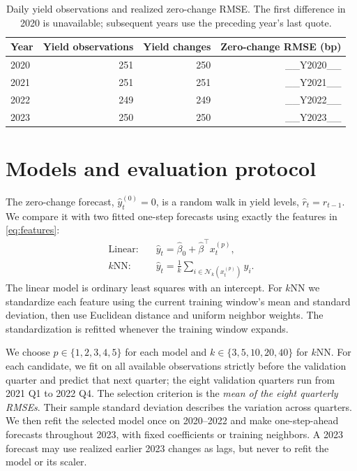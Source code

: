 \documentclass[10pt,letterpaper]{article}
\begin{document}
\begin{table}[H]
\centering
\caption{Daily yield observations and realized zero-change RMSE. The first difference in 2020 is unavailable; subsequent years use the preceding year's last quote.}
\label{tab:data}
\begin{tabular}{lrrr}
\toprule
Year & Yield observations & Yield changes & Zero-change RMSE (bp)\\
\midrule
2020 & 251 & 250 & __Y2020__\\
2021 & 251 & 251 & __Y2021__\\
2022 & 249 & 249 & __Y2022__\\
2023 & 250 & 250 & __Y2023__\\
\bottomrule
\end{tabular}
\end{table}

\section{Models and evaluation protocol}
The zero-change forecast, $\widehat y_t^{(0)}=0$, is a random walk in yield levels, $\widehat r_t=r_{t-1}$. We compare it with two fitted one-step forecasts using exactly the features in \eqref{eq:features}:
\begin{align}
\text{Linear:}\quad &\widehat y_t=\widehat\beta_0+\widehat\beta^\top x_t^{(p)},\\
\text{$k$NN:}\quad &\widehat y_t=\frac1k\sum_{i\in\mathcal N_k(x_t^{(p)})}y_i.
\end{align}
The linear model is ordinary least squares with an intercept. For $k$NN we standardize each feature using the current training window's mean and standard deviation, then use Euclidean distance and uniform neighbor weights. The standardization is refitted whenever the training window expands.

We choose $p\in\{1,2,3,4,5\}$ for each model and $k\in\{3,5,10,20,40\}$ for $k$NN. For each candidate, we fit on all available observations strictly before the validation quarter and predict that next quarter; the eight validation quarters run from 2021 Q1 to 2022 Q4. The selection criterion is the \emph{mean of the eight quarterly RMSEs}. Their sample standard deviation describes the variation across quarters. We then refit the selected model once on 2020--2022 and make one-step-ahead forecasts throughout 2023, with fixed coefficients or training neighbors. A 2023 forecast may use realized earlier 2023 changes as lags, but never to refit the model or its scaler.
\end{document}
